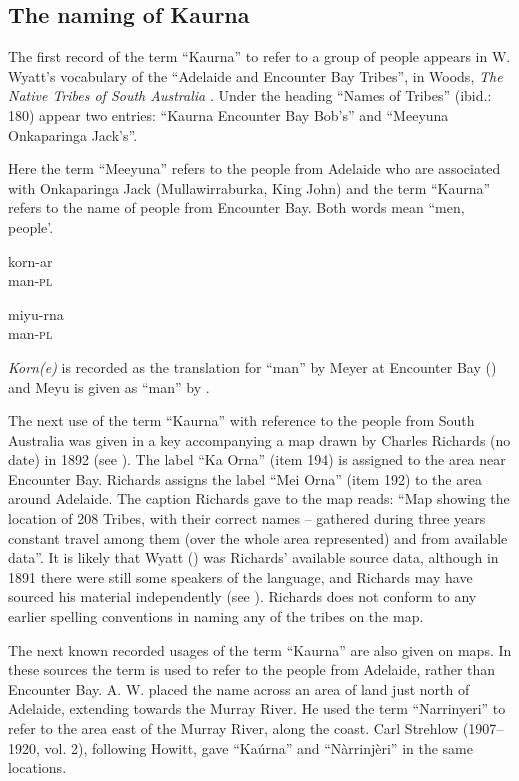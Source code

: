 \subsection{The naming of Kaurna}
\label{sec:key:5.1.1}

The first record of the term “Kaurna” to refer to a group of people appears in W. Wyatt’s vocabulary of the “Adelaide and Encounter Bay Tribes”, in Woods, \textit{The Native Tribes of South Australia} \citeyearpar[180]{woods1879}. Under the heading “Names of Tribes” (ibid.: 180) appear two entries: ``Kaurna Encounter Bay Bob's'' and ``Meeyuna Onkaparinga Jack's''.

Here the term “Meeyuna” refers to the people from Adelaide who are associated with Onkaparinga Jack (Mullawirraburka, King John) and the term “Kaurna” refers to the name of people from Encounter Bay. Both words mean “men, people’. 

\ea
\gll korn-ar \\
	  man-\textsc{pl} \\
\z

\ea
\gll miyu-rna \\
	  man-\textsc{pl} \\
\z


\textit{Korn(e)} is recorded as the translation for “man” by Meyer at Encounter Bay (\citeyear[12]{meyer_vocabulary_1843}) and Meyu is given as “man” by \citet[23]{teichelmann_outlines_1840}. 

The next use of the term “Kaurna” with reference to the people from South Australia was given in a key accompanying a map drawn by Charles Richards (no date) in 1892 (see \citealt[18--19]{knapman_mapping_2011}). The label ``Ka Orna'' (item 194) is assigned to the area near Encounter Bay. Richards assigns the label ``Mei Orna'' (item 192) to the area around Adelaide. The caption Richards gave to the map reads: “Map showing the location of 208 Tribes, with their correct names – gathered during three years constant travel among them (over the whole area represented) and from available data”. It is likely that Wyatt (\citealt{woods1879}) was Richards' available source data, although in 1891 there were still some speakers of the language, and Richards may have sourced his material independently (see \citealt[78--80]{gara_life_1990}). Richards does not conform to any earlier spelling conventions in naming any of the tribes on the map.

The next known recorded usages of the term “Kaurna” are also given on maps. In these sources the term is used to refer to the people from Adelaide, rather than Encounter Bay. A. W. \citet[opp. p. 44]{howitt_native_1904} placed the name across an area of land just north of Adelaide, extending towards the Murray River. He used the term “Narrinyeri” to refer to the area east of the Murray River, along the coast. Carl Strehlow (1907--1920, vol. 2), following Howitt, gave “Kaúrna” and ``Nàrrinjèri'' in the same locations.


